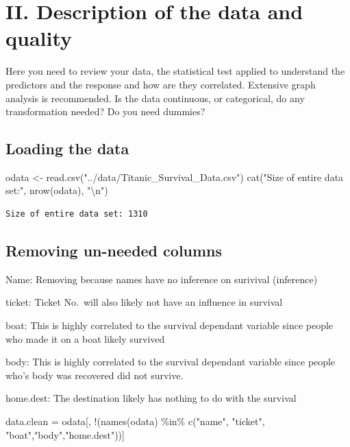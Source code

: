 \documentclass[
  letterpaper,
  DIV=11,
  numbers=noendperiod]{scrartcl}
\newenvironment{Shaded}{\begin{snugshade}}{\end{snugshade}}
\newcommand{\FunctionTok}[1]{\textcolor[rgb]{0.28,0.35,0.67}{#1}}
\newcommand{\NormalTok}[1]{\textcolor[rgb]{0.00,0.23,0.31}{#1}}
\newcommand{\OtherTok}[1]{\textcolor[rgb]{0.00,0.23,0.31}{#1}}
\newcommand{\SpecialCharTok}[1]{\textcolor[rgb]{0.37,0.37,0.37}{#1}}
\newcommand{\StringTok}[1]{\textcolor[rgb]{0.13,0.47,0.30}{#1}}
\begin{document}
\section{II. Description of the data and
quality}\label{ii.-description-of-the-data-and-quality}

Here you need to review your data, the statistical test applied to
understand the predictors and the response and how are they correlated.
Extensive graph analysis is recommended. Is the data continuous, or
categorical, do any transformation needed? Do you need dummies?

\subsection{Loading the data}\label{loading-the-data}

\begin{Shaded}
\begin{Highlighting}[]
\NormalTok{odata }\OtherTok{\textless{}{-}} \FunctionTok{read.csv}\NormalTok{(}\StringTok{"../data/Titanic\_Survival\_Data.csv"}\NormalTok{)}
\FunctionTok{cat}\NormalTok{(}\StringTok{"Size of entire data set:"}\NormalTok{, }\FunctionTok{nrow}\NormalTok{(odata), }\StringTok{"}\SpecialCharTok{\textbackslash{}n}\StringTok{"}\NormalTok{)}
\end{Highlighting}
\end{Shaded}

\begin{verbatim}
Size of entire data set: 1310 
\end{verbatim}

\subsection{Removing un-needed
columns}\label{removing-un-needed-columns}

Name: Removing because names have no inference on surivival (inference)

ticket: Ticket No.~will also likely not have an influence in survival

boat: This is highly correlated to the survival dependant variable since
people who made it on a boat likely survived

body: This is highly correlated to the survival dependant variable since
people who's body was recovered did not survive.

home.dest: The destination likely has nothing to do with the survival

\begin{Shaded}
\begin{Highlighting}[]
\NormalTok{data.clean }\OtherTok{=}\NormalTok{ odata[, }\SpecialCharTok{!}\NormalTok{(}\FunctionTok{names}\NormalTok{(odata) }\SpecialCharTok{\%in\%} \FunctionTok{c}\NormalTok{(}\StringTok{"name"}\NormalTok{, }\StringTok{"ticket"}\NormalTok{, }\StringTok{"boat"}\NormalTok{,}\StringTok{"body"}\NormalTok{,}\StringTok{"home.dest"}\NormalTok{))]}
\end{Highlighting}
\end{Shaded}
\end{document}
